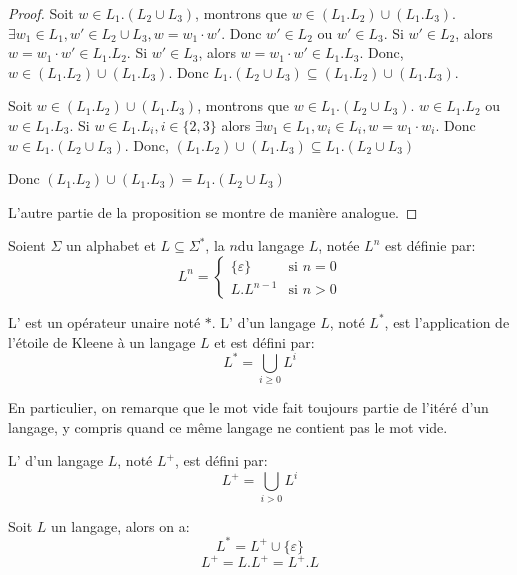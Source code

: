 \begin{proof}
    Soit $w \in L_1 . (L_2 \cup L_3)$, montrons que $w \in (L_1 . L_2) \cup (L_1 . L_3)$.
    $\exists w_1 \in L_1, w' \in L_2 \cup L_3, w = w_1 \cdot w'$. Donc $w' \in L_2$ ou $w' \in L_3$.
    Si $w' \in L_2$, alors $w = w_1 \cdot w' \in L_1 . L_2$.
    Si $w' \in L_3$, alors $w = w_1 \cdot w' \in L_1 . L_3$.
    Donc, $w \in (L_1 . L_2) \cup (L_1 . L_3)$.
    Donc $L_1 . (L_2 \cup L_3) \subseteq (L_1 . L_2) \cup (L_1 . L_3)$.

    Soit $w \in (L_1 . L_2) \cup (L_1 . L_3)$, montrons que $w \in L_1 . (L_2 \cup L_3)$.
    $w \in L_1 . L_2$ ou $w \in L_1 . L_3$.
    Si $w \in L_1 . L_i, i \in \{ 2, 3\}$ alors $\exists w_1 \in L_1, w_i \in L_i, w = w_1 \cdot w_i$.
    Donc $w \in L_1 . (L_2 \cup L_3)$.
    Donc, $(L_1 . L_2) \cup (L_1 . L_3) \subseteq L_1 . (L_2 \cup L_3)$

    Donc $(L_1 . L_2) \cup (L_1 . L_3) = L_1 . (L_2 \cup L_3)$

    L'autre partie de la proposition se montre de manière analogue.
\end{proof}


\begin{definition}
    Soient \( \Sigma \) un alphabet et \( L \subseteq \Sigma^* \), la  \( n \)\ieme du langage \( L \), notée \( L^n \) est définie par:
    \[
      L^n =
      \begin{cases}
        \{ \varepsilon \} & \text{si $n = 0$} \\
        L . L^{n-1}       & \text{si $n > 0$}
      \end{cases}
    \]
\end{definition}


\begin{definition}
    L' est un opérateur unaire noté \( * \). L' d'un langage \( L \), noté \( L^* \), est l'application de l'étoile de Kleene à un langage \( L \) et est défini par:
    \begin{equation}
        L^* = \bigcup_{i \geq 0} L^i
    \end{equation}
\end{definition}

En particulier, on remarque que le mot vide fait toujours partie de l'itéré d'un langage, y compris quand ce même langage ne contient pas le mot vide.

\begin{definition}
  L' d'un langage \( L \), noté \( L^+ \), est défini par:
    \begin{equation}
        L^+ = \bigcup_{i > 0} L^i
    \end{equation}
\end{definition}

\begin{proposition}
  Soit \( L \) un langage, alors on a:
  \begin{equation}
    L^* = L^+ \cup \{ \varepsilon \}
  \end{equation}
  \begin{equation}
    L^+ = L.L^+ = L^+.L
  \end{equation}
\end{proposition}

